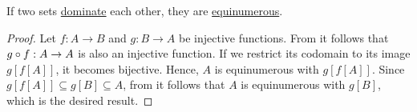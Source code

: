 \begin{theorem}\label{thm:cantor_schroder_bernstein_theorem}
  If two sets \hyperref[def:equinumerosity]{dominate} each other, they are \hyperref[def:equinumerosity]{equinumerous}.
\end{theorem}
\begin{proof}
  Let \( f: A \to B \) and \( g: B \to A \) be injective functions. From  it follows that \( g \bincirc f: A \to A \) is also an injective function. If we restrict its codomain to its image \( g[f[A]] \), it becomes bijective. Hence, \( A \) is equinumerous with \( g[f[A]] \). Since \( g[f[A]] \subseteq g[B] \subseteq A \), from  it follows that \( A \) is equinumerous with \( g[B] \), which is the desired result.
\end{proof}

